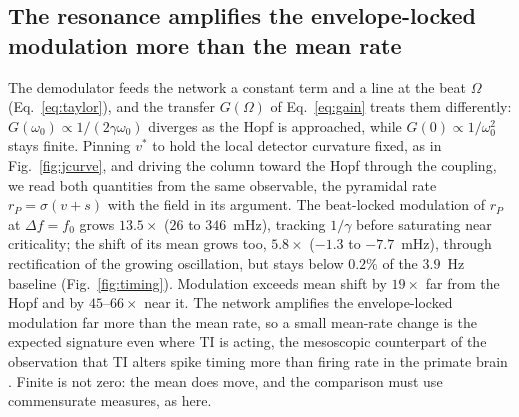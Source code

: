 \documentclass[11pt,a4paper]{article}
\newcommand{\Sig}{\sigma}
\begin{document}
\subsection{The resonance amplifies the envelope-locked modulation more than the mean rate}\label{sec:timing}
The demodulator feeds the network a constant term and a line at the beat $\Omega$
(Eq.~\eqref{eq:taylor}), and the transfer $G(\Omega)$ of Eq.~\eqref{eq:gain} treats them
differently: $G(\omega_0)\propto1/(2\gamma\omega_0)$ diverges as the Hopf is approached,
while $G(0)\propto1/\omega_0^2$ stays finite. Pinning $v^*$ to hold the local detector
curvature fixed, as in Fig.~\ref{fig:jcurve}, and driving the column toward the Hopf
through the coupling, we read both quantities from the same observable, the pyramidal
rate $r_P=\Sig(v+s)$ with the field in its argument. The beat-locked modulation of $r_P$ at
$\Delta f=f_0$ grows $13.5\times$ ($26$ to $346$~mHz), tracking $1/\gamma$ before
saturating near criticality; the shift of its mean grows too, $5.8\times$ ($-1.3$ to
$-7.7$~mHz), through rectification of the growing oscillation, but stays below $0.2\%$ of
the $3.9$~Hz baseline (Fig.~\ref{fig:timing}). Modulation exceeds mean shift by $19\times$
far from the Hopf and by $45$--$66\times$ near it. The network amplifies the
envelope-locked modulation far more than the mean rate, so a small mean-rate change is
the expected signature even where TI is acting, the mesoscopic counterpart of the
observation that TI alters spike timing more than firing rate in the primate brain
\cite{vieira2024}. Finite is not zero: the mean does move, and the comparison must use
commensurate measures, as here.
\end{document}
